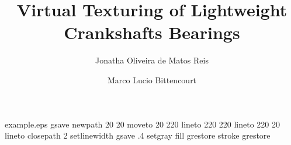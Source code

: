 %
%
%
%
%
\begin{filecontents*}{example.eps}
gsave
newpath
  20 20 moveto
  20 220 lineto
  220 220 lineto
  220 20 lineto
closepath
2 setlinewidth
gsave
  .4 setgray fill
grestore
stroke
grestore
\end{filecontents*}
%
\RequirePackage{fix-cm}
%
\documentclass[smallextended]{svjour3}       %
%
\smartqed  %
%
\usepackage{graphicx}
%
%
%
%
%


\title{Virtual Texturing of Lightweight Crankshafts
	Bearings%
}


\author{Jonatha Oliveira de Matos Reis         \and
        Marco Lucio Bittencourt %
}


